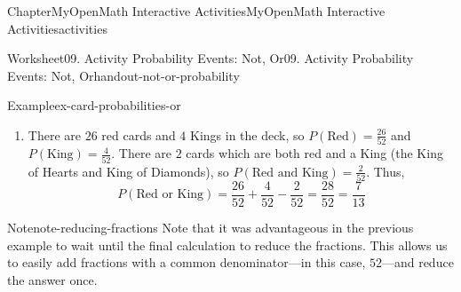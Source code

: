 \documentclass[oneside,10pt,]{book}
\newcommand{\blocktitlefont}{\relax}
\newcommand{\ptxlistdisc}{\raisebox{0.3ex}{\textbullet}}
\newlength{\fillinmaxwidth}
\newlength{\fillincontract}
\newlength{\charmaxwidth}\setlength{\charmaxwidth}{0.5em}
\newlength{\charminwidth}\setlength{\charminwidth}{0.1em}
\newlength{\fillinheight}
\newcommand{\fillintext}[1]{%
\setlength{\fillinmaxwidth}{#1\charmaxwidth}%
\setlength{\fillincontract}{#1\charminwidth}%
\setlength{\fillinheight}{\baselineskip}\addtolength{\fillinheight}{1.2pt}%
\strut\nobreak\leaders\vbox{\hrule width 0.3pt height 0.3pt \vskip -1.2pt}\hskip 1\fillinmaxwidth minus \fillincontract\nobreak\strut%
}
\begin{document}
\begin{chapterptx}{Chapter}{MyOpenMath Interactive Activities}{}{MyOpenMath Interactive Activities}{}{}{activities}
\begin{worksheet-section}{Worksheet}{09. Activity Probability Events: Not, Or}{}{09. Activity Probability Events: Not, Or}{}{}{handout-not-or-probability}
\begin{example}{Example}{}{ex-card-probabilities-or}
\begin{enumerate}[label={\alph*}]
\begin{equation*}
P(\text{Queen or King}) = \frac{4}{52} + \frac{4}{52} - 0 = \frac{8}{52} = \frac{2}{13}
\end{equation*}
%
\item{}There are \(26\) red cards and \(4\) Kings in the deck, so \(P(\text{Red}) = \frac{26}{52}\) and \(P(\text{King}) = \frac{4}{52}\). There are \(2\) cards which are both red and a King (the King of Hearts and King of Diamonds), so \(P(\text{Red and King}) = \frac{2}{52}\). Thus,%
\begin{equation*}
P(\text{Red or King}) = \frac{26}{52} + \frac{4}{52} - \frac{2}{52} = \frac{28}{52} = \frac{7}{13}
\end{equation*}
%
\end{enumerate}
%
\end{example}
\begin{note}{Note}{}{note-reducing-fractions}%
Note that it was advantageous in the previous example to wait until the final calculation to reduce the fractions. This allows us to easily add fractions with a common denominator—in this case, \(52\)—and reduce the answer once.%
\end{note}
%
\end{worksheet-section}
\end{chapterptx}
\end{document}
